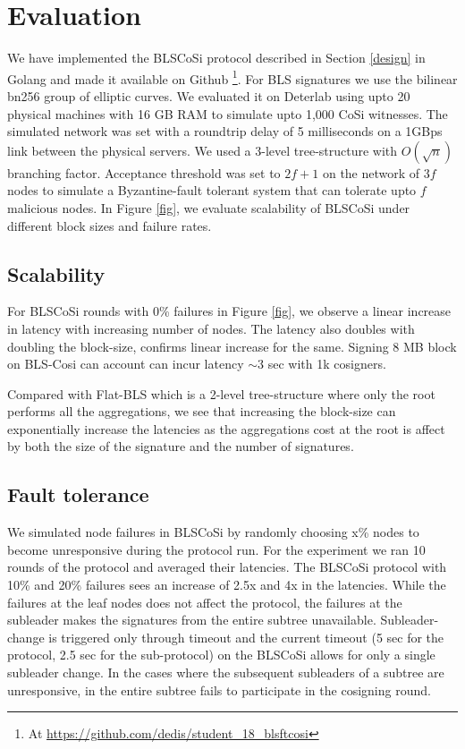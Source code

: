 \section{Evaluation}
\label{eval}
We have implemented the BLSCoSi protocol described in Section \ref{design} in Golang and made it available on Github \footnote{At \hyperlink{BLSFTCoSi}{https://github.com/dedis/student\_18\_blsftcosi}}. For BLS signatures we use the bilinear bn256 \cite{bn256}  group of elliptic curves. We evaluated it on Deterlab\cite{deterlab} using upto 20 physical machines with 16 GB RAM to simulate upto 1,000 CoSi witnesses. The simulated network was set with a roundtrip delay of 5 milliseconds on a 1GBps link between the physical servers. We used a 3-level tree-structure with $O(\sqrt{n})$ branching factor. Acceptance threshold was set to $2f +1$ on the network of $3f$ nodes to simulate a Byzantine-fault tolerant system that can tolerate upto $f$ malicious nodes. In Figure \ref{fig}, we evaluate scalability of BLSCoSi under different block sizes and failure rates. 

\subsection{Scalability}
 For BLSCoSi rounds with 0\% failures in Figure \ref{fig}, we observe a linear increase in latency with increasing number of nodes. The latency also doubles with doubling the block-size, confirms linear increase for the same. Signing 8 MB block on BLS-Cosi can account can incur latency $\sim$3 sec with 1k cosigners.

Compared with Flat-BLS which is a 2-level tree-structure where only the root performs all the aggregations, we see that increasing the block-size can exponentially increase the latencies as the aggregations cost at the root is affect by both the size of the signature and the number of signatures.

\subsection{Fault tolerance}
We simulated node failures in BLSCoSi by randomly choosing x\% nodes to become unresponsive during the protocol run. For the experiment we ran 10 rounds of the protocol and averaged their latencies. The BLSCoSi protocol with 10\% and 20\% failures sees an increase of 2.5x and 4x in the latencies. While the failures at the leaf nodes does not affect the protocol, the failures at the subleader makes the signatures from the entire subtree unavailable. Subleader-change is triggered only through timeout and the current timeout (5 sec for the protocol, 2.5 sec for the sub-protocol) on the  BLSCoSi allows for only a single subleader change. In the cases where the subsequent subleaders of a subtree are unresponsive, in the entire subtree fails to participate in the cosigning round. 

